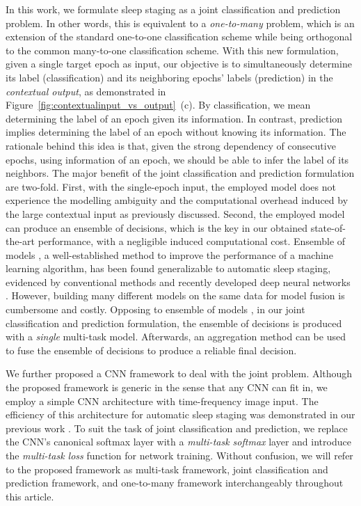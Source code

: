 \documentclass[10pt,twocolumn,twoside]{IEEEtran}
\begin{document}
In this work, we formulate sleep staging as a joint classification and prediction problem. In other words, this is equivalent to a \emph{one-to-many} problem, which is an extension of the standard one-to-one classification scheme while being orthogonal to the common many-to-one classification scheme. With this new formulation, given a single target epoch as input, our objective is to simultaneously determine its label (classification) and its neighboring epochs' labels (prediction) in the \emph{contextual output}, as demonstrated in Figure~\ref{fig:contextualinput_vs_output}~(c). By classification, we mean determining the label of an epoch given its information. In contrast, prediction implies determining the label of an epoch without knowing its information. The rationale behind this idea is that, given the strong dependency of consecutive epochs, using information of an epoch, we should be able to infer the label of its neighbors. The major benefit of the joint classification and prediction formulation are two-fold. First, with the single-epoch input, the employed model does not experience the modelling ambiguity and the computational overhead induced by the large contextual input as previously discussed. Second, the employed model can
produce an ensemble of decisions, which is the key in our obtained state-of-the-art performance, with a negligible induced computational cost. Ensemble of models \cite{Hinton2015,Dietterich2000}, a well-established method to improve the performance of a machine learning algorithm, has been found generalizable to automatic sleep staging, evidenced by conventional methods \cite{Alickovic2018, Bhuiyan2016, Koley2012} and recently developed deep neural networks \cite{Stephansen2017}. However, building many different models on the same data for model fusion is cumbersome and costly. Opposing to ensemble of models \cite{Stephansen2017, Alickovic2018, Bhuiyan2016, Koley2012}, in our joint classification and prediction formulation, the ensemble of decisions is produced with a \emph{single} multi-task model. Afterwards, an aggregation method can be used to fuse the ensemble of decisions to produce a reliable final decision.

We further proposed a CNN framework to deal with the joint problem. Although the proposed framework is generic in the sense that any CNN can fit in, we employ a simple CNN architecture with time-frequency image input. The efficiency of this architecture for automatic sleep staging was demonstrated in our previous work \cite{Phan2018c}. To suit the task of joint classification and prediction, we replace the CNN's canonical softmax layer with a \emph{multi-task softmax} layer and introduce the \emph{multi-task loss} function for network training. Without confusion, we will refer to the proposed framework as multi-task framework, joint classification and prediction framework, and one-to-many framework interchangeably throughout this article.
\end{document}
